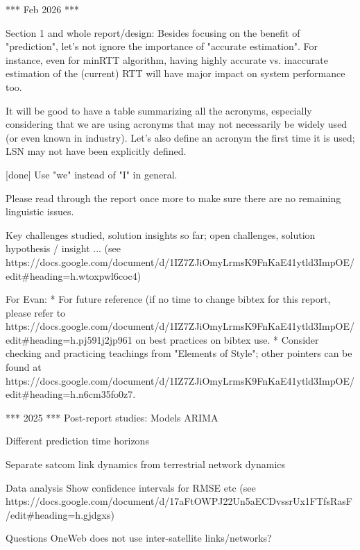 

*** Feb 2026 ***

Section 1 and whole report/design:
    Besides focusing on the benefit of "prediction", let's not ignore the importance of "accurate estimation". For instance, even for minRTT algorithm, having highly accurate vs. inaccurate estimation of the (current) RTT will have major impact on system performance too. 

It will be good to have a table summarizing all the acronyms, especially considering that we are using acronyms that may not necessarily be widely used (or even known in industry). 
    Let's also define an acronym the first time it is used; 
    LSN may not have been explicitly defined. 

[done] Use "we" instead of "I" in general. 

Please read through the report once more to make sure there are no remaining linguistic issues. 

Key challenges studied, solution insights so far; open challenges, solution hypothesis / insight ... (see https://docs.google.com/document/d/1IZ7ZJiOmyLrmsK9FnKaE41ytld3ImpOE/edit#heading=h.wtoxpwl6coc4) 


For Evan: 
    * For future reference (if no time to change bibtex for this report, please refer to https://docs.google.com/document/d/1IZ7ZJiOmyLrmsK9FnKaE41ytld3ImpOE/edit#heading=h.pj591j2jp961 on best practices on bibtex use.
    * Consider checking and practicing teachings from "Elements of Style"; other pointers can be found at https://docs.google.com/document/d/1IZ7ZJiOmyLrmsK9FnKaE41ytld3ImpOE/edit#heading=h.n6cm35fo0z7. 


*** 2025 *** 
Post-report studies:
    Models
        ARIMA

    Different prediction time horizons 
        
    Separate satcom link dynamics from terrestrial network dynamics

    Data analysis
        Show confidence intervals for RMSE etc (see https://docs.google.com/document/d/17aFtOWPJ22Un5aECDvssrUx1FTfsRasF/edit#heading=h.gjdgxs)

Questions
    OneWeb does not use inter-satellite links/networks? 
    
